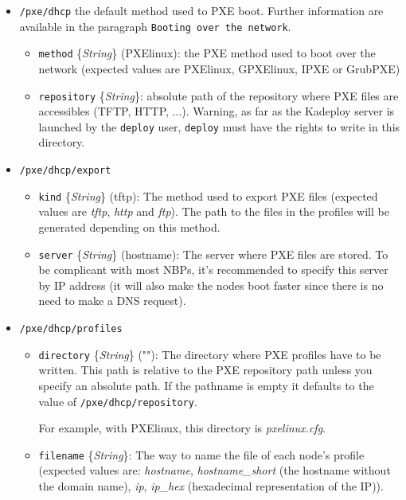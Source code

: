 \documentclass[a4wide,10pt,oneside]{book}
\newcommand{\ypath}[1]{\texttt{#1}}
\newcommand{\yfield}[2]{\texttt{#1} {\small\{{\emph{#2}}\}}:}
\newcommand{\yfieldd}[3]{\texttt{#1} {\small\{{\emph{#2}}\}} {\small(}#3{\small)}:}
\begin{document}
\begin{itemize}
  \item \ypath{/pxe/dhcp} the default method used to PXE boot. Further information are available in the paragraph \texttt{Booting over the network}.
  \begin{itemize}
    \item \yfieldd{method}{String}{PXElinux} the PXE method used to boot over the network (expected values are PXElinux, GPXElinux, IPXE or GrubPXE)
    \item \yfield{repository}{String} absolute path of the repository where PXE files are accessibles (TFTP, HTTP, ...). Warning, as far as the Kadeploy server is launched by the \texttt{deploy} user, \texttt{deploy} must have the rights to write in this directory.
  \end{itemize}
  \item \ypath{/pxe/dhcp/export}
  \begin{itemize}
    \item \yfieldd{kind}{String}{tftp} The method used to export PXE files (expected values are \emph{tftp}, \emph{http} and \emph{ftp}). The path to the files in the profiles will be generated depending on this method.
    \item \yfieldd{server}{String}{hostname} The server where PXE files are stored. To be complicant with most NBPs, it's recommended to specify this server by IP address (it will also make the nodes boot faster since there is no need to make a DNS request).
  \end{itemize}
  \item \ypath{/pxe/dhcp/profiles}
  \begin{itemize}
    \item \yfieldd{directory}{String}{""} The directory where PXE profiles have to be written. This path is relative to the PXE repository path unless you specify an absolute path. If the pathname is empty it defaults to the value of \ypath{/pxe/dhcp/repository}.

For example, with PXElinux, this directory is \emph{pxelinux.cfg}.
    \item \yfield{filename}{String} The way to name the file of each node's profile (expected values are: \emph{hostname}, \emph{hostname\_short} (the hostname without the domain name), \emph{ip}, \emph{ip\_hex} (hexadecimal representation of the IP)).


\end{itemize}
\end{itemize}
\end{document}
